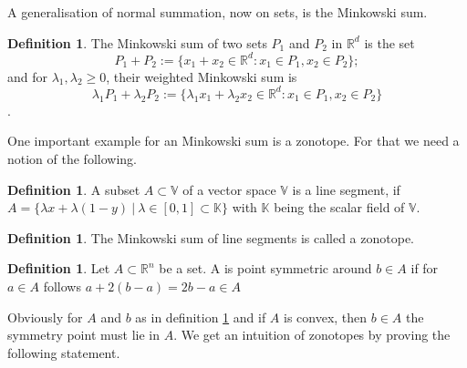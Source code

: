 \documentclass{article}
\theoremstyle{definition}
\newtheorem{definition}[theorem]{Definition}
\begin{document}
A generalisation of normal summation, now on sets, is the Minkowski sum.

\begin{definition}\cite[p.~4]{zhang2018tropical}
The Minkowski sum of two sets $P_1$ and $P_2$ in $\mathbb{R}^{d}$ is the set
$$ P_1 + P_2 := \{x_1 + x_2 \in \mathbb{R}^{d} : x_1 \in P_1 ,x_2 \in P_2 \};$$
and for $\lambda_1 , \lambda_2 \geq 0$, their weighted Minkowski sum is
$$ \lambda_1 P_1 + \lambda_2 P_2 := \{ \lambda_1 x_1 + \lambda_2 x_2 \in \mathbb{R}^{d} : x_1 \in P_1 , x_2 \in P_2 \} $$.
\end{definition}

One important example for an Minkowski sum is a zonotope. For that we need a notion of the following.
\begin{definition}
A subset $A \subset \mathbb{V}$ of a vector space $\mathbb{V}$ is a line segment, if $A=\{\lambda x + \lambda (1-y) \ | \ \lambda \in [0,1]\subset \mathbb{K}\}$ with $\mathbb{K}$ being the scalar field of $\mathbb{V}$.
\end{definition}

\begin{definition}
The Minkowski sum of line segments is called a zonotope.
\end{definition}

\begin{definition}
\label{def:point_sym}
Let $A \subset \mathbb{R}^{n}$ be a set. A is point symmetric around $b \in A$ if for $a \in A$ follows $a + 2(b-a)=2b-a \in A$
\end{definition}

Obviously for $A$ and $b$ as in definition \ref{def:point_sym} and if $A$ is convex, then $b \in A$ the symmetry point must lie in $A$. We get an intuition of zonotopes by proving the following statement.
\end{document}
